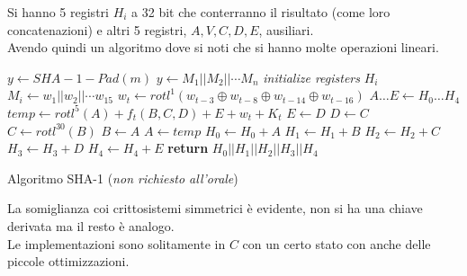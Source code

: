 \documentclass[a4paper,12pt, oneside]{book}
\begin{document}
Si hanno 5 registri $H_i$ a 32 bit che conterranno il risultato (come loro
concatenazioni) e altri 5 registri, $A,V,C,D,E$, ausiliari.\\
Avendo quindi un algoritmo dove si noti che si hanno molte operazioni lineari.\\
\begin{algorithm}
  \begin{algorithmic}
    \State $y\gets SHA-1-Pad(m)$
    \State $y\gets M_1||M_2||\cdots M_n$
    \State \textit{initialize registers} $H_i$
    \State $M_i\gets w_1||w_2||\cdots w_{15}$
    \State $w_t\gets rotl^1(w_{t-3}\oplus w_{t-8}\oplus w_{t-14}\oplus w_{t-16})$
    \EndFor
    \State $A\ldots E\gets H_0\ldots H_4$
    \State $temp\gets rotl^5(A)+f_t(B,C,D)+E+w_t+K_t$
    \State $E\gets D$
    \State $D\gets C$
    \State $C\gets rotl^{30}(B)$
    \State $B\gets A$
    \State $A\gets temp$
    \EndFor
    \State $H_0\gets H_0+A$
    \State $H_1\gets H_1+B$
    \State $H_2\gets H_2+C$
    \State $H_3\gets H_3+D$
    \State $H_4\gets H_4+E$
    \EndFor
    \State \textbf{return} $H_0||H_1||H_2||H_3||H_4$
    \EndFunction
  \end{algorithmic}
  \caption{Algoritmo SHA-1 (\textit{non richiesto all'orale})}
\end{algorithm}
La somiglianza coi crittosistemi simmetrici è evidente, non si ha una chiave
derivata ma il resto è analogo.\\
Le implementazioni sono solitamente in $C$ con un certo stato con anche delle
piccole ottimizzazioni.
\end{document}
